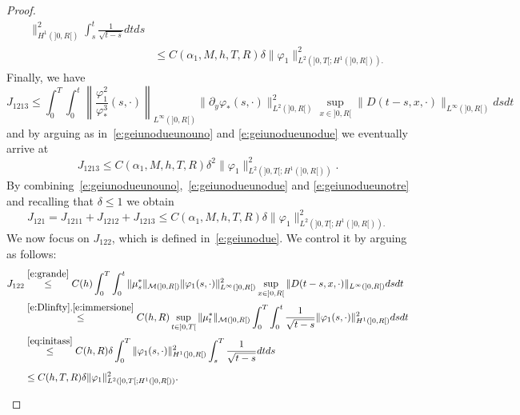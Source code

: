 \documentclass[11pt,leqno]{amsart}
\numberwithin{equation}{section}
\begin{document}
\begin{proof}
\begin{equation}
\begin{split}
    \|^2_{H^1 (]0, R[)} \int_s^t \frac{1}{\sqrt{t-s}} dt ds
    \\
    & \leq C(\alpha_1, M, h, T, R) \delta \| {\varphi}_1 \|^2_{L^2 (]0, T[; H^1 (]0,
      R[)).}  
  \end{split}
\end{equation}
Finally, we have 
$$
    J_{1213} \leq 
   \int_0^T 
  \int_0^t 
  \left\| \frac{{\varphi}_1^2}{{\varphi}_\ast^3}
  (s, \cdot) \right\|_{L^\infty (]0, R[)}
   \|  \partial_y {\varphi}_\ast (s, \cdot) \|^2_{L^2 (]0, R[)}
   \sup_{x \in ]0, R[}  \|D(t-s, x, \cdot ) \|_{L^\infty (]0, R[) }
  ds dt 
  $$
  and by arguing as in~\eqref{e:geiunodueunouno} and \eqref{e:geiunodueunodue}
  we eventually arrive at 
\begin{equation}
\label{e:geiunodueunotre}
      J_{1213}
      \leq 
    C(\alpha_1, M, h, T, R) \delta^2 
    \| {\varphi}_1  \|^2_{L^2 (]0, T[; H^1 (]0, R[))}. 
\end{equation}
By combining~\eqref{e:geiunodueunouno},~\eqref{e:geiunodueunodue} and \eqref{e:geiunodueunotre} and recalling that $\delta \leq 1$ we obtain 
\begin{equation}
\label{e:geiunodueunofinal}
      J_{121} =  J_{1211}+  J_{1212} +  J_{1213} \leq 
     C(\alpha_1, M, h, T, R) \delta 
    \| {\varphi}_1  \|^2_{L^2 (]0, T[; H^1 (]0, R[)).} 
\end{equation} 
We now focus on $J_{122}$, which is defined in~\eqref{e:geiunodue}. We control 
 it by arguing as follows:
\begin{equation}
\label{e:geiunoduedue}
\begin{split}
  J_{122} & \stackrel{\eqref{e:grande}}{\leq}  
  C(h) \int_0^T 
  \int_0^t 
  \| \mu_s^\ast \|_{\mathcal M(]0, R[)} 
   \|  {\varphi}_1 (s, \cdot) \|^2_{L^\infty (]0, R[)}
    \sup_{x \in ]0, R[}  \| D(t-s, x, \cdot ) \|_{L^\infty (]0, R[) }
  ds dt \\
  &  \stackrel{\eqref{e:Dlinfty},\eqref{e:immersione}}{\leq}
  C(h, R) \sup_{t \in ]0, T[}  \| \mu_t^\ast \|_{\mathcal M(]0, R[)} 
  \int_0^T \int_0^t \frac{1}{\sqrt{t-s}} 
    \|  {\varphi}_1 (s, \cdot) \|^2_{H^1 (]0, R[)} ds dt  \\
    &  \stackrel{\eqref{eq:initass}}{\leq}
    C(h, R) \delta \int_0^T   
     \|  {\varphi}_1 (s, \cdot) \|^2_{H^1 (]0, R[)} \int_s^T 
     \frac{1}{\sqrt{t-s}} 
      dt ds \\ & \leq C(h, T, R) \delta 
      \|  {\varphi}_1  \|^2_{L^2 (]0, T[; H^1 (]0, R[))}. \phantom{\int}
\end{split}
\end{equation}

\end{proof}
\end{document}
